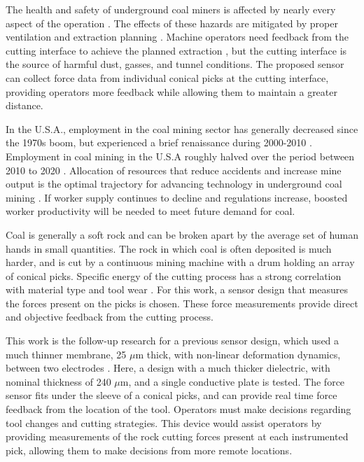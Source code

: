 The health and safety of underground coal miners is affected by 
nearly every aspect of the operation \cite{Khanzode2011}.
The effects of these hazards are mitigated by proper ventilation and extraction planning \cite{Saleh2011}.
Machine operators need feedback from the cutting interface to achieve the planned extraction \cite{Bartels2009},
but the cutting interface is the source of harmful dust, gasses, and tunnel conditions.
The proposed sensor can collect force data from individual conical picks at the cutting interface, 
providing operators more feedback while allowing them to maintain a greater distance.

In the U.S.A., employment in the coal mining sector has generally 
decreased since the 1970s boom, but experienced a brief renaissance during 2000-2010 \cite{Betz2015}.
Employment in coal mining in the U.S.A roughly halved over the period between 2010 to 2020 \cite{FRED2023}.
Allocation of resources that reduce accidents and increase mine output is 
the optimal trajectory for advancing technology in underground coal mining \cite{Sider1983}.
If worker supply continues to decline and regulations increase,
boosted worker productivity will be needed to meet future demand for coal.

Coal is generally a soft rock and can be broken apart by the average set of human hands in small quantities.
The rock in which coal is often deposited is much harder, 
and is cut by a continuous mining machine with a drum holding an array of conical picks.
Specific energy of the cutting process has a strong correlation with material type and tool wear \cite{TEALE196557}.
For this work, a sensor design that measures the forces present on the picks is chosen. 
These force measurements provide direct and objective feedback from the cutting process.

This work is the follow-up research for a previous sensor design, 
which used a much thinner membrane, 25 $\mu$m thick, with non-linear deformation dynamics,
between two electrodes \cite{oltmanns2023low}.
Here, a design with a much thicker dielectric, 
with nominal thickness of 240 $\mu$m, and a single conductive plate is tested.
The force sensor fits under the sleeve of a conical picks, 
and can provide real time force feedback from the location of the tool.
Operators must make decisions regarding tool changes and cutting strategies.
This device would assist operators by providing measurements of the rock cutting forces
present at each instrumented pick, allowing them to make decisions from more remote locations.

